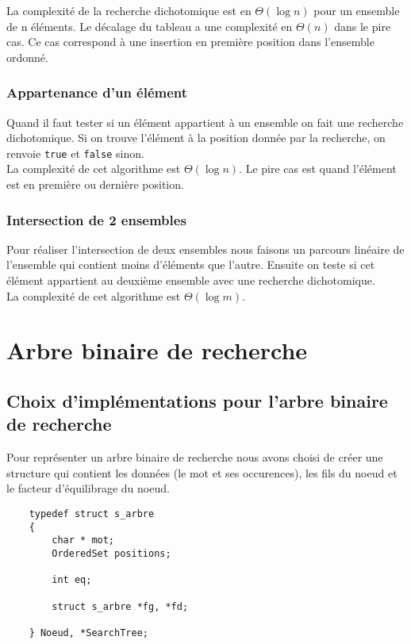 \documentclass[11pt]{article}
\begin{document}
        La complexité de la recherche dichotomique est en $\Theta(\log{}n)$ pour
        un ensemble de n éléments. Le décalage du tableau a une complexité en
        $\Theta(n)$ dans le pire cas. Ce cas correspond à une insertion
        en première position dans l'ensemble ordonné.

        \subsubsection{Appartenance d'un élément}
        Quand il faut tester si un élément appartient à un ensemble on fait
        une recherche dichotomique. Si on trouve l'élément à la position donnée
        par la recherche, on renvoie \texttt{true} et \texttt{false} sinon.\\

        La complexité de cet algorithme est $\Theta(\log{}n)$. Le pire cas
        est quand l'élément est en première ou dernière position.

        \subsubsection{Intersection de 2 ensembles}
        Pour réaliser l'intersection de deux ensembles nous faisons un parcours
        linéaire de l'ensemble qui contient moins d'éléments que l'autre. Ensuite
        on teste si cet élément appartient au deuxième ensemble avec une
        recherche dichotomique.\\

        La complexité de cet algorithme est $\Theta(\log{}m)$.


\section{Arbre binaire de recherche}

    \subsection{Choix d'implémentations pour l'arbre binaire de recherche}
    Pour représenter un arbre binaire de recherche nous avons choisi de créer
    une structure qui contient les données (le mot et ses occurences), les fils
    du noeud et le facteur d'équilibrage du noeud.

    \begin{verbatim}
    typedef struct s_arbre
    {
        char * mot;
        OrderedSet positions;

        int eq;

        struct s_arbre *fg, *fd;

    } Noeud, *SearchTree;
    \end{verbatim}
\end{document}
